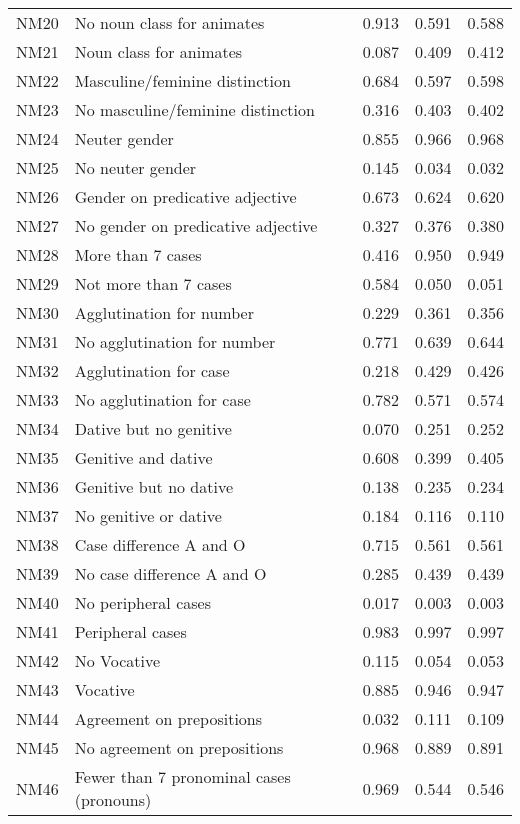 \begin{longtable}{lllll}
NM20 & No noun class for animates & 0.913 & 0.591 & 0.588\\
NM21 & Noun class for animates & 0.087 & 0.409 & 0.412\\
NM22 & Masculine/feminine distinction & 0.684 & 0.597 & 0.598\\
NM23 & No masculine/feminine distinction & 0.316 & 0.403 & 0.402\\
NM24 & Neuter gender & 0.855 & 0.966 & 0.968\\
NM25 & No neuter gender & 0.145 & 0.034 & 0.032\\
NM26 & Gender on predicative adjective & 0.673 & 0.624 & 0.620\\
NM27 & No gender on predicative adjective & 0.327 & 0.376 & 0.380\\
NM28 & More than 7 cases & 0.416 & 0.950 & 0.949\\
NM29 & Not more than 7 cases & 0.584 & 0.050 & 0.051\\
NM30 & Agglutination for number & 0.229 & 0.361 & 0.356\\
NM31 & No agglutination for number & 0.771 & 0.639 & 0.644\\
NM32 & Agglutination for case & 0.218 & 0.429 & 0.426\\
NM33 & No agglutination for case & 0.782 & 0.571 & 0.574\\
NM34 & Dative but no genitive & 0.070 & 0.251 & 0.252\\
NM35 & Genitive and dative & 0.608 & 0.399 & 0.405\\
NM36 & Genitive but no dative & 0.138 & 0.235 & 0.234\\
NM37 & No genitive or dative & 0.184 & 0.116 & 0.110\\
NM38 & Case difference A and O & 0.715 & 0.561 & 0.561\\
NM39 & No case difference A and O & 0.285 & 0.439 & 0.439\\
NM40 & No peripheral cases & 0.017 & 0.003 & 0.003\\
NM41 & Peripheral cases & 0.983 & 0.997 & 0.997\\
NM42 & No Vocative & 0.115 & 0.054 & 0.053\\
NM43 & Vocative & 0.885 & 0.946 & 0.947\\
NM44 & Agreement on prepositions & 0.032 & 0.111 & 0.109\\
NM45 & No agreement on prepositions & 0.968 & 0.889 & 0.891\\
NM46 & Fewer than 7 pronominal cases (pronouns) & 0.969 & 0.544 & 0.546\\

\end{longtable}
